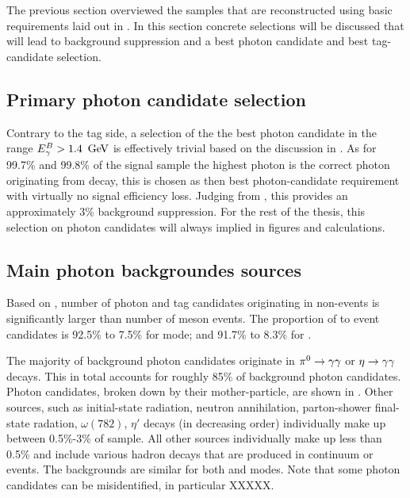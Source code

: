 The previous section overviewed the samples that are reconstructed using basic requirements laid out in .
In this section concrete selections will be discussed that will lead to background suppression and a best photon candidate
and best tag-candidate selection.

\subsection{Primary photon candidate selection}\label{sec:primary_photon_candidate_selection}
Contrary to the tag side, a selection of the the best photon candidate in the range ${E^B_{\gamma}}>1.4~\mathrm{\,Ge\kern -0.1em V}$ is effectively trivial based on the discussion in .
As for 99.7\% and 99.8\% of the signal \MC sample the highest \EB photon is the correct photon originating from \BtoXsgamma decay,
this is chosen as then best photon-candidate requirement with virtually no signal efficiency loss.
Judging from , this provides an approximately 3\% background suppression.
For the rest of the thesis, this selection on photon candidates will always implied in figures and calculations.
\subsection{Main photon backgroundes sources}\label{sec:main_background_sources}

Based on , number of photon and tag candidates originating 
in non-\BB events is significantly larger than number of \B meson events.
The proportion of \qqbar to \BB event candidates is 92.5\% to 7.5\% for \FEI \Bp mode;
and 91.7\% to 8.3\% for \FEI \Bz.

The majority of background photon candidates originate in $\pi^0\rightarrow\gamma\gamma$ or $\eta\rightarrow\gamma\gamma$ decays.
This in total accounts for roughly 85\% of background photon candidates.
Photon candidates, broken down by their mother-particle, are shown in .
Other sources, such as initial-state radiation, neutron annihilation, parton-shower final-state radation, $\omega(782)$, $\eta'$ decays (in decreasing order) individually make up between 0.5\%-3\% of sample.
All other sources individually make up less than 0.5\% and include various hadron decays that are produced in continuum or \B events.
The backgrounds are similar for both \FEI \Bp and \Bz modes.
Note that some photon candidates can be misidentified, in particular XXXXX.

